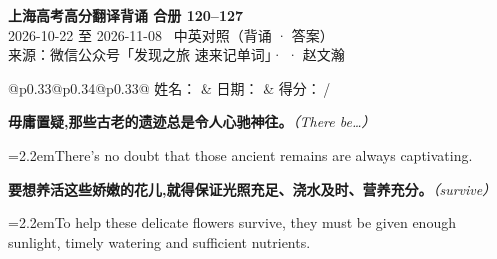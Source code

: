 \documentclass[11pt,a4paper]{article}
\newcommand{\num}[1]{\makebox[1.9em][r]{#1.}\hspace{0.3em}}
\newcommand{\prompt}[1]{\emph{\textcolor{tipblue}{\small（#1）}}}
\begin{document}
\pagestyle{plain}
\begin{center}
{\LARGE\bfseries 上海高考高分翻译背诵 \quad 合册 120–127}\\[0.25em]
{\large 2026-10-22 至 2026-11-08 \quad\ 中英对照（背诵 · 答案）}\\[0.35em]
{\footnotesize 来源：微信公众号「发现之旅 速来记单词」·  · 赵文瀚}
\end{center}

\vspace{0.4em}
\noindent\begin{tabular}{@{}p{0.33\textwidth}@{}p{0.34\textwidth}@{}p{0.33\textwidth}@{}}
姓名：\underline{\hspace{2.0cm}} & 日期：\underline{\hspace{2.0cm}} & 得分：\underline{\hspace{1.4cm}}\,/ \\
\end{tabular}

\vspace{0.5em}

\vspace{0.8em}
\vspace{0.35em}\vspace{0.15em}

\begin{minipage}{\linewidth}

\num{1}\textbf{毋庸置疑,那些古老的遗迹总是令人心驰神往。}\prompt{There be…}

\vspace{0.15em}

\noindent\hangindent=2.2em\hspace{2.2em}There’s no doubt that those ancient remains are always captivating.

\end{minipage}

\begin{minipage}{\linewidth}

\num{2}\textbf{要想养活这些娇嫩的花儿,就得保证光照充足、浇水及时、营养充分。}\prompt{survive}

\vspace{0.15em}

\noindent\hangindent=2.2em\hspace{2.2em}To help these delicate flowers survive, they must be given enough sunlight, timely watering and sufficient nutrients.

\end{minipage}
\end{document}
